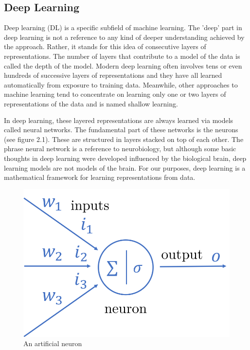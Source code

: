 \subsection{Deep Learning}\label{subsec:deep-learning}

Deep learning (DL) is a specific subfield of machine learning.
The 'deep' part in deep learning is not a reference to any kind of deeper understanding achieved by the approach.
Rather, it stands for this idea of consecutive layers of representations.
The number of layers that contribute to a model of the data is called the depth of the model.
Modern deep learning often involves tens or even hundreds of successive layers of representations and they
have all learned automatically from exposure to training data.
Meanwhile, other approaches to machine learning tend to concentrate on learning only one or two layers of
representations of the data and is named shallow learning.

In deep learning, these layered representations are always learned via models called neural networks.
The fundamental part of these networks is the neurons (see figure 2.1).
These are structured in layers stacked on top of each other.
The phrase neural network is a reference to neurobiology, but although some basic thoughts in deep learning were
developed influenced by the biological brain, deep learning models are not models of the brain.
For our purposes, deep learning is a mathematical framework for learning representations from data.

\begin{figure}[H]
    \centering
    \includegraphics[scale=.40]{./images/background/neuron.png}
    \caption{An artificial neuron}
    \label{fig:neuron_fig}
\end{figure}

